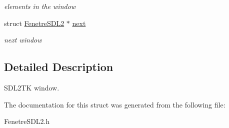 \begin{DoxyCompactItemize}
\begin{DoxyCompactList}\small\item\em elements in the window \end{DoxyCompactList}\item 
struct \hyperlink{structFenetreSDL2}{Fenetre\+S\+D\+L2} $\ast$ \hyperlink{structFenetreSDL2_af33557a17195576675f370ee98849954}{next}\hypertarget{structFenetreSDL2_af33557a17195576675f370ee98849954}{}\label{structFenetreSDL2_af33557a17195576675f370ee98849954}

\begin{DoxyCompactList}\small\item\em next window \end{DoxyCompactList}\end{DoxyCompactItemize}


\subsection{Detailed Description}
S\+D\+L2\+TK window. 

The documentation for this struct was generated from the following file\+:\begin{DoxyCompactItemize}
\item 
Fenetre\+S\+D\+L2.\+h\end{DoxyCompactItemize}
